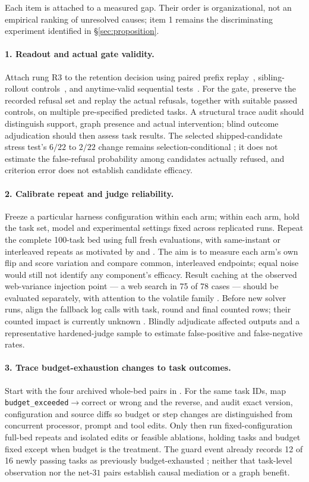 Each item is attached to a measured gap. Their order is organizational,
not an empirical ranking of unresolved causes; item 1 remains the
discriminating experiment identified in \S\ref{sec:proposition}.

\paragraph{1. Readout and actual gate validity.} Attach rung R3 to the
retention decision using paired prefix replay~\cite{shepherd,car},
sibling-rollout controls~\cite{craft}, and anytime-valid sequential
tests~\cite{pace}. For the gate, preserve the recorded refusal set and
replay the actual refusals, together with suitable passed
controls, on multiple pre-specified predicted tasks. A structural trace
audit should distinguish support, graph presence and actual intervention;
blind outcome adjudication should then assess task results. The selected shipped-candidate stress test's
$6/22$ to $2/22$ change remains selection-conditional ; it does not
estimate the false-refusal probability among candidates actually refused,
and criterion error does not establish candidate efficacy.

\paragraph{2. Calibrate repeat and judge reliability.} Freeze a particular
harness configuration within each arm; within each arm, hold the task set,
model and experimental settings fixed across replicated runs. Repeat the
complete 100-task bed using full fresh evaluations, with same-instant or
interleaved repeats as motivated by  and . The aim is
to measure each arm's own flip and score variation and compare common,
interleaved endpoints; equal noise would still not identify any component's
efficacy. Result caching at the observed web-variance injection point --- a
web search in 75 of 78 cases  --- should be evaluated separately,
with attention to the volatile family . Before new
solver runs, align the fallback log calls with task, round and final counted
rows; their counted impact is currently unknown . Blindly
adjudicate affected outputs and a representative hardened-judge sample to
estimate false-positive and false-negative rates.

\paragraph{3. Trace budget-exhaustion changes to task outcomes.} Start with
the four archived whole-bed pairs in . For the same task IDs, map
\texttt{budget\_exceeded}$\rightarrow$correct or wrong and the reverse,
and audit exact version, configuration and source diffs so budget or step
changes are distinguished from concurrent processor, prompt and tool edits.
Only then run fixed-configuration full-bed repeats and isolated edits or
feasible ablations, holding tasks and budget fixed except when budget is the
treatment. The guard event already records 12 of 16 newly passing tasks as
previously budget-exhausted ; neither that task-level observation nor
the net-$31$ pairs establish causal mediation or a graph benefit.

